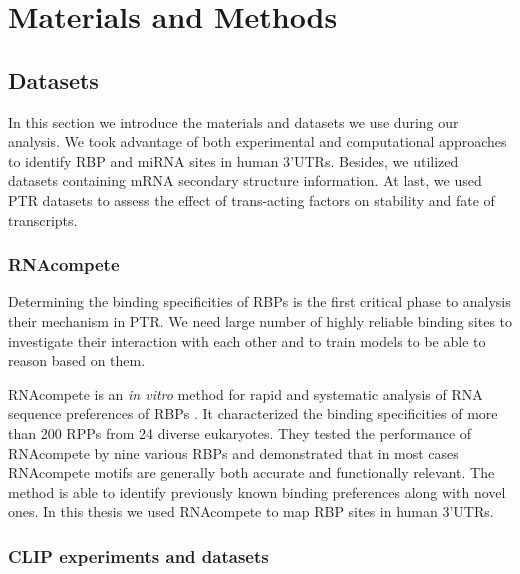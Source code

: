 \chapter{Materials and Methods}
\label{chp:chapter3}

\section{Datasets}

In this section we introduce the materials and datasets we use during our analysis. We took advantage of both experimental and computational approaches to identify RBP and miRNA sites in human 3'UTRs. Besides, we utilized datasets containing mRNA secondary structure information. At last, we used PTR datasets to assess the effect of trans-acting factors on stability and fate of transcripts.

\subsection{RNAcompete }

Determining the binding specificities of RBPs is the first critical phase to analysis their mechanism in PTR. We need large number of highly reliable binding sites to investigate their interaction with each other and to train models to be able to reason based on them.

RNAcompete is an \textit{in vitro} method for rapid and systematic analysis of RNA sequence preferences of RBPs \cite{rnacompete_09}. It characterized the binding specificities of more than 200 RPPs from 24 diverse eukaryotes. They tested the performance of RNAcompete by nine various RBPs and demonstrated that in most cases RNAcompete motifs are generally both accurate and functionally relevant. The method is able to identify previously known binding preferences along with novel ones. In this thesis we used RNAcompete to map RBP sites in human 3'UTRs.


\subsection{CLIP experiments and datasets}

